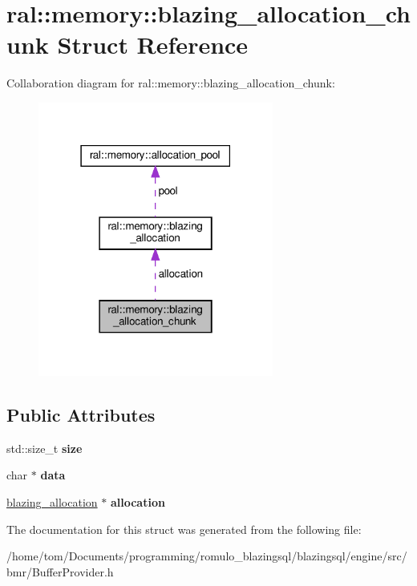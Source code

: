 \hypertarget{structral_1_1memory_1_1blazing__allocation__chunk}{}\section{ral\+:\+:memory\+:\+:blazing\+\_\+allocation\+\_\+chunk Struct Reference}
\label{structral_1_1memory_1_1blazing__allocation__chunk}


Collaboration diagram for ral\+:\+:memory\+:\+:blazing\+\_\+allocation\+\_\+chunk\+:\nopagebreak
\begin{figure}[H]
\begin{center}
\leavevmode
\includegraphics[width=219pt]{structral_1_1memory_1_1blazing__allocation__chunk__coll__graph}
\end{center}
\end{figure}
\subsection*{Public Attributes}
\begin{DoxyCompactItemize}
\item 
\mbox{\label{structral_1_1memory_1_1blazing__allocation__chunk_a1c4cc63300596da92a5d17a0d2ce0420}} 
std\+::size\+\_\+t {\bfseries size}
\item 
\mbox{\label{structral_1_1memory_1_1blazing__allocation__chunk_a47417bd330d4cf9c5c86b94ebf6ba5b3}} 
char $\ast$ {\bfseries data}
\item 
\mbox{\label{structral_1_1memory_1_1blazing__allocation__chunk_a6262370e4a6385ed2da015fa6787511b}} 
\hyperlink{structral_1_1memory_1_1blazing__allocation}{blazing\+\_\+allocation} $\ast$ {\bfseries allocation}
\end{DoxyCompactItemize}


The documentation for this struct was generated from the following file\+:\begin{DoxyCompactItemize}
\item 
/home/tom/\+Documents/programming/romulo\+\_\+blazingsql/blazingsql/engine/src/bmr/Buffer\+Provider.\+h\end{DoxyCompactItemize}

